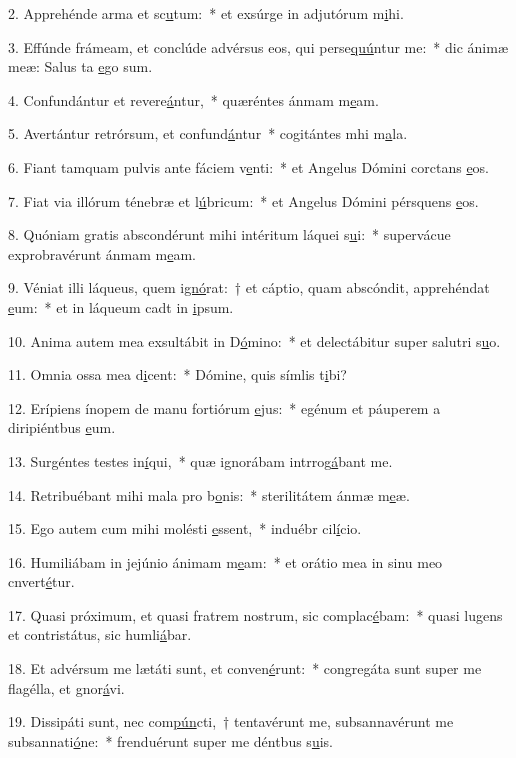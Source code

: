 2. Apprehénde arma et sc\uline{u}tum:~* et exsúrge in adjutórum m\uline{i}hi.\par 
3. Effúnde frámeam, et conclúde advérsus eos, qui perse\uline{quú}ntur me:~* dic ánimæ meæ: Salus ta \uline{e}go sum.\par 
4. Confundántur et revere\uline{á}ntur,~* quæréntes ánmam m\uline{e}am.\par 
5. Avertántur retrórsum, et confund\uline{á}ntur~* cogitántes mhi m\uline{a}la.\par 
6. Fiant tamquam pulvis ante fáciem v\uline{e}nti:~* et Angelus Dómini corctans \uline{e}os.\par 
7. Fiat via illórum ténebræ et l\uline{ú}bricum:~* et Angelus Dómini pérsquens \uline{e}os.\par 
8. Quóniam gratis abscondérunt mihi intéritum láquei s\uline{u}i:~* supervácue exprobravérunt ánmam m\uline{e}am.\par 
9. Véniat illi láqueus, quem i\uline{gnó}rat:~† et cáptio, quam abscóndit, apprehéndat \uline{e}um:~* et in láqueum cadt in \uline{i}psum.\par 
10. Anima autem mea exsultábit in D\uline{ó}mino:~* et delectábitur super salutri s\uline{u}o.\par 
11. Omnia ossa mea d\uline{i}cent:~* Dómine, quis símlis t\uline{i}bi?\par 
12. Erípiens ínopem de manu fortiórum \uline{e}jus:~* egénum et páuperem a diripiéntbus \uline{e}um.\par 
13. Surgéntes testes in\uline{í}qui,~* quæ ignorábam intrrog\uline{á}bant me.\par 
14. Retribuébant mihi mala pro b\uline{o}nis:~* sterilitátem ánmæ m\uline{e}æ.\par 
15. Ego autem cum mihi molésti \uline{e}ssent,~* induébr cil\uline{í}cio.\par 
16. Humiliábam in jejúnio ánimam m\uline{e}am:~* et orátio mea in sinu meo cnvert\uline{é}tur.\par 
17. Quasi próximum, et quasi fratrem nostrum, sic complac\uline{é}bam:~* quasi lugens et contristátus, sic humli\uline{á}bar.\par 
18. Et advérsum me lætáti sunt, et conven\uline{é}runt:~* congregáta sunt super me flagélla, et gnor\uline{á}vi.\par 
19. Dissipáti sunt, nec com\uline{pún}cti,~† tentavérunt me, subsannavérunt me subsannati\uline{ó}ne:~* frenduérunt super me déntbus s\uline{u}is.\par 
